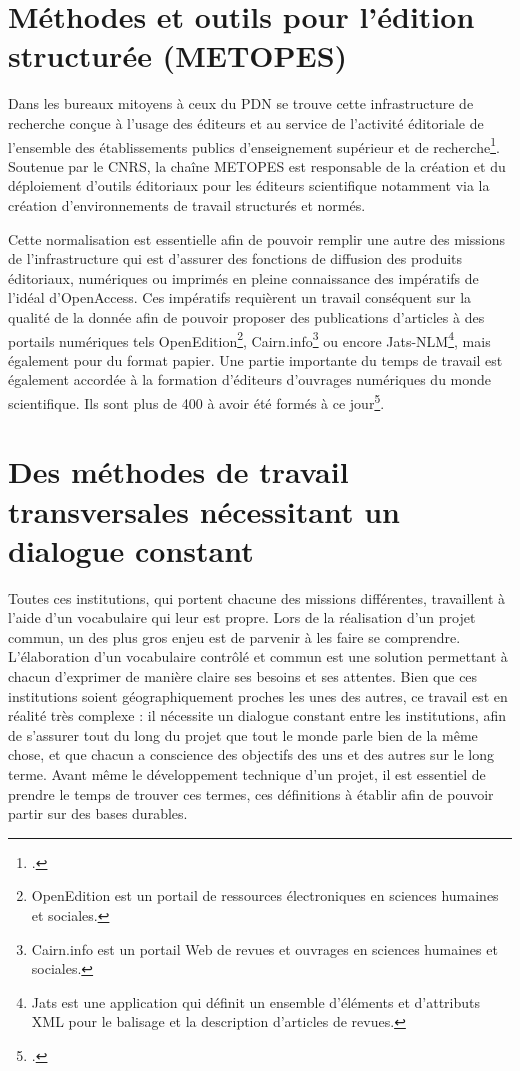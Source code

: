 \documentclass[a4paper,12pt,twoside]{book}
\begin{document}
    \section{Méthodes et outils pour l'édition structurée (METOPES)}

    Dans les bureaux mitoyens à ceux du \acrshort{PDN} se trouve cette infrastructure de recherche conçue \og à l'usage des éditeurs et au service de l'activité éditoriale de l'ensemble des établissements publics d'enseignement supérieur et de recherche\footcite{Métopes}\fg. Soutenue par le CNRS, la chaîne METOPES est responsable de la création et du déploiement d'outils éditoriaux pour les éditeurs scientifique notamment via la création d'environnements de travail structurés et normés.
    
    Cette normalisation est essentielle afin de pouvoir remplir une autre des missions de l'infrastructure qui est d'assurer des fonctions de diffusion des produits éditoriaux, numériques ou imprimés en pleine connaissance des impératifs de l'idéal d'OpenAccess. Ces impératifs requièrent un travail conséquent sur la qualité de la donnée afin de pouvoir proposer des publications d'articles à des portails numériques tels OpenEdition\footnote{OpenEdition est un portail de ressources électroniques en sciences humaines et sociales.}, Cairn.info\footnote{Cairn.info est un portail Web de revues et ouvrages en sciences humaines et sociales.} ou encore Jats-NLM\footnote{Jats est une application qui définit un ensemble d'éléments et d'attributs XML pour le balisage et la description d'articles de revues.}, mais également pour du format papier. Une partie importante du temps de travail est également accordée à la formation d'éditeurs d'ouvrages numériques du monde scientifique. Ils sont plus de 400 à avoir été formés à ce jour\footcite{Métopes}.
    
    \section{Des méthodes de travail transversales nécessitant un dialogue constant}
    
     Toutes ces institutions, qui portent chacune des missions différentes, travaillent à l'aide d'un vocabulaire qui leur est propre. Lors de la réalisation d'un projet commun, un des plus gros enjeu est de parvenir à les faire se comprendre. L'élaboration d'un vocabulaire contrôlé et commun est une solution permettant à chacun d'exprimer de manière claire ses besoins et ses attentes.
     Bien que ces institutions soient géographiquement proches les unes des autres, ce travail est en réalité très complexe : il nécessite un dialogue constant entre les institutions, afin de s'assurer tout du long du projet que tout le monde parle bien de la même chose, et que chacun a conscience des objectifs des uns et des autres sur le long terme.
     Avant même le développement technique d'un projet, il est essentiel de prendre le temps de trouver ces termes, ces définitions à établir afin de pouvoir partir sur des bases durables. 
     
\end{document}
